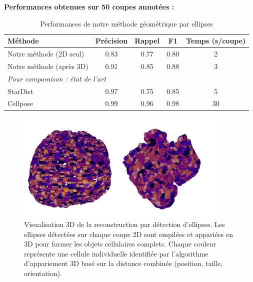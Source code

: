 \textbf{Performances obtenues sur 50 coupes annotées :}
\begin{table}[h]
\centering
\caption{Performances de notre méthode géométrique par ellipses}
\begin{tabular}{lcccc}
\toprule
\textbf{Méthode} & \textbf{Précision} & \textbf{Rappel} & \textbf{F1} & \textbf{Temps (s/coupe)} \\
\midrule
Notre méthode (2D seul) & 0.83 & 0.77 & 0.80 & 2 \\
Notre méthode (après 3D) & 0.91 & 0.85 & 0.88 & 3 \\
\midrule
\multicolumn{5}{l}{\textit{Pour comparaison : état de l'art}} \\
StarDist & 0.97 & 0.75 & 0.85 & 5 \\
Cellpose & 0.99 & 0.96 & 0.98 & 30 \\
\bottomrule
\end{tabular}
\end{table}

\begin{figure}[htbp]
    \centering
    \includegraphics[width=0.9\textwidth]{../img/3Dreco.png}
    \caption{Visualisation 3D de la reconstruction par détection d'ellipses. Les ellipses détectées sur chaque coupe 2D sont empilées et appariées en 3D pour former les objets cellulaires complets. Chaque couleur représente une cellule individuelle identifiée par l'algorithme d'appariement 3D basé sur la distance combinée (position, taille, orientation).}
    \label{fig:3Dreco}
\end{figure}

